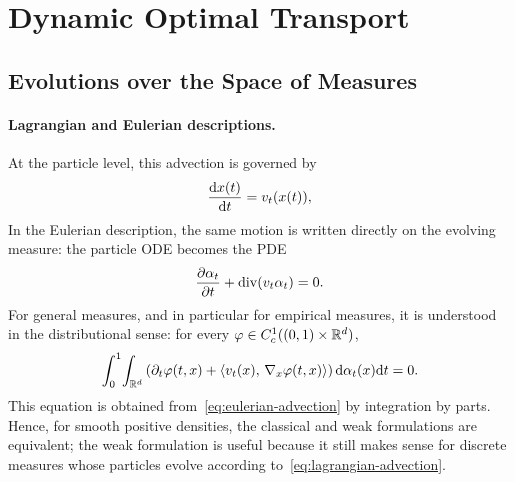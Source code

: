 \section{Dynamic Optimal Transport}
\label{sec-dynamic-optimal-transport}
\subsection{Evolutions over the Space of Measures}
\paragraph{Lagrangian and Eulerian descriptions.}
At the particle level, this advection is governed by
\begin{equation}
\frac{\mathrm{d} x(t)}{\mathrm{d} t} = v_t(x(t)), \label{eq:lagrangian-advection}
\end{equation}
In the Eulerian description, the same motion is written directly on the evolving measure: the particle ODE becomes the PDE
\begin{equation}
\frac{\partial \alpha_t}{\partial t} + \operatorname{div}(v_t \alpha_t) = 0. \label{eq:eulerian-advection}
\end{equation}
For general measures, and in particular for empirical measures, it is understood in the distributional sense: for every $\varphi\in C_c^1((0,1)\times\mathbb{R}^d)$,
\begin{equation}\label{eq:eulerian-advection-weak}
\int_0^1\!\int_{\mathbb{R}^d}
\left(\partial_t\varphi(t,x)+\langle v_t(x),\,\nabla_x\varphi(t,x)\rangle\right)
\mathrm{d}\alpha_t(x)\mathrm{d} t
=
0.
\end{equation}
This equation is obtained from~\eqref{eq:eulerian-advection} by integration by parts. Hence, for smooth positive densities, the classical and weak formulations are equivalent; the weak formulation is useful because it still makes sense for discrete measures whose particles evolve according to~\eqref{eq:lagrangian-advection}.

